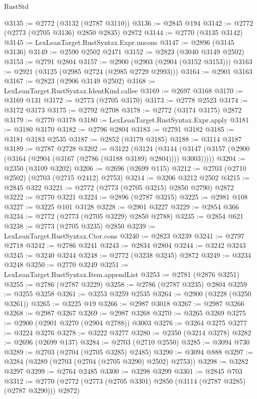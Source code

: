 \begin{lexlean}{RustStd}
\begin{coremodule}
@3135 := @2772 (@3132 (@2787 @3110))
@3136 := @2845 @194
@3142 := @2772 (@2773 (@2705 @3136) @2850 @2835) @2872
@3144 := @2770 (@3135 @3142)
@3145 := LexLeanTarget.RustSyntax.Expr.uncons
@3147 := @2896 (@3145 @3136)
@3149 := @2590 @2502 @2471
@3152 := @2823 (@3040 @3149 @2502)
@3153 := @2791 @2804
@3157 := @2900 (@2903 (@2904 (@3152 @3153)))
@3163 := @2921 (@3125 (@2985 @2724 (@2985 @2729 @2993)))
@3164 := @2901 @3163
@3167 := @2823 (@2906 @3149 @2502)
@3168 := LexLeanTarget.RustSyntax.IdentKind.callee
@3169 := @2697 @3168
@3170 := @3169 @131
@3172 := @2773 (@2705 @3170)
@3173 := @2778 @2523
@3174 := @3172 @3173
@3175 := @2792 @2708
@3178 := @2772 (@3174 @3175) @2872
@3179 := @2770 @3178
@3180 := LexLeanTarget.RustSyntax.Expr.apply
@3181 := @3180 @3170
@3182 := @2796 @2804
@3183 := @2791 @3182
@3185 := @3181 @3183 @2535
@3187 := @2852 (@3179 @3185)
@3188 := @3114 @3187
@3189 := @2787 @2728
@3202 := @3122
    (@3124
      (@3144 (@3147 (@3157 (@2900 (@3164 (@2904 (@3167 (@2786 (@3188 @3189) @2804)))) @3003)))))
@3204 := @2350 (@3109 @3202)
@3206 := @2696 (@2699 @115)
@3212 := @2703 (@2710 @2502) (@2703 (@2715 @2412) @2753)
@3214 := @3206 @3212 @2502
@3215 := @2845 @322
@3221 := @2772 (@2773 (@2705 @3215) @2850 @2790) @2872
@3222 := @2770 @3221
@3224 := @2896 (@2787 @3215)
@3225 := @2981 @108
@3227 := @3225 @101 @3128
@3228 := @2901 @3227
@3229 := @2854 @366
@3234 := @2772 (@2773 (@2705 @3229) @2850 @2788)
@3235 := @2854 @621
@3238 := @2773 (@2705 @3235) @2850
@3239 := LexLeanTarget.RustSyntax.Ctor.cons
@3240 := @2823 @3239
@3241 := @2797 @2718
@3242 := @2786 @3241
@3243 := @2834 @2804
@3244 := @3242 @3243
@3245 := @3240 @3244
@3248 := @2772 (@3238 @3245) @2872
@3249 := @3234 @3248
@3250 := @2770 @3249
@3251 := LexLeanTarget.RustSyntax.Item.appendList
@3253 := @2781 (@2876 @3251)
@3255 := @2786 (@2787 @3229)
@3258 := @2786 (@2787 @3235) @2804
@3259 := @3255 @3258
@3261 := @3253 @3259 @2535
@3264 := @2900 (@3228 (@3250 @3261))
@3265 := @3225 @19
@3266 := @2987 @3018
@3267 := @2987 @3266
@3268 := @2987 @3267
@3269 := @2987 @3268
@3270 := @3265 @3269
@3275 := @2900 (@2901 @3270 (@2904 @2788)) @3003
@3276 := @3264 @3275
@3277 := @3224 @3276
@3278 := @3222 @3277
@3280 := @2350 (@3214 @3278)
@3282 := @2696 (@2699 @137)
@3284 := @2703 (@2710 @2550)
@3285 := @3094 @730
@3289 := @2703 (@2704 (@2705 @3285) @2485)
@3290 := @3094 @888
@3297 := @3284 (@3289 (@2703 (@2704 (@2705 @3290) @2502) @2753))
@3298 := @3282 @3297
@3299 := @2764 @2485
@3300 := @3298 @3299
@3301 := @2845 @703
@3312 := @2770 (@2772 (@2773 (@2705 @3301) @2850 (@3114 (@2787 @3285) (@2787 @3290))) @2872)

\end{coremodule}
\end{lexlean}
